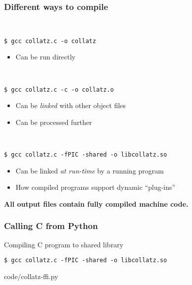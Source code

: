 \documentclass[rgb,dvipsnames,aspectratio=169,xcolor=table]{beamer}
\begin{document}
\begin{frame}[fragile]
  \frametitle{Different ways to compile}

  \begin{description}
    \pause
  \item[To executable program \texttt{collatz}]\hfill\\
\begin{verbatim}
$ gcc collatz.c -o collatz
\end{verbatim}
    \begin{itemize}
    \item Can be run directly
    \end{itemize}

    \pause
  \item[To object file \texttt{collatz.o}]\hfill\\
\begin{verbatim}
$ gcc collatz.c -c -o collatz.o
\end{verbatim}
    \begin{itemize}
    \item Can be \textit{linked} with other object files
    \item Can be processed further
    \end{itemize}

\pause
  \item[To shared object file \texttt{libcollatz.so}]\hfill\\
\begin{verbatim}
$ gcc collatz.c -fPIC -shared -o libcollatz.so
\end{verbatim}
    \begin{itemize}
    \item Can be linked \textit{at run-time} by a running program
    \item How compiled programs support dynamic ``plug-ins''
    \end{itemize}
  \end{description}

  \textbf{All output files contain fully compiled machine code.}

\end{frame}

\begin{frame}[fragile]
  \frametitle{Calling C from Python}

  \begin{block}{Compiling C program to shared library}
\begin{verbatim}
$ gcc collatz.c -fPIC -shared -o libcollatz.so
\end{verbatim}
  \end{block}


{code/collatz-ffi.py}
\end{frame}
\end{document}
